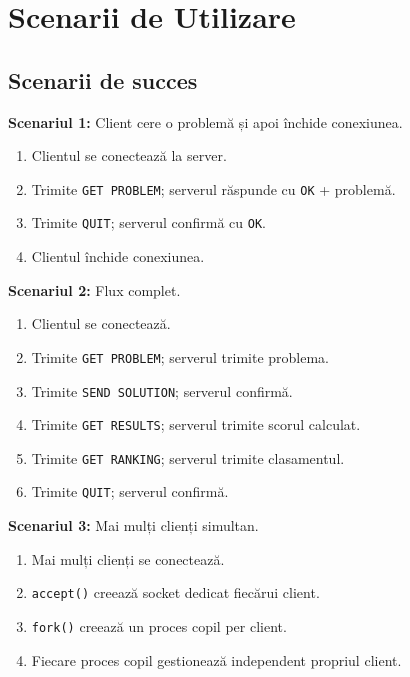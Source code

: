 \documentclass[runningheads]{llncs}
\begin{document}
\section{Scenarii de Utilizare}

\subsection{Scenarii de succes}

\textbf{Scenariul 1:} Client cere o problemă și apoi închide conexiunea.
\begin{enumerate}[noitemsep, topsep=0pt]
    \item Clientul se conectează la server.
    \item Trimite \texttt{GET PROBLEM}; serverul răspunde cu \texttt{OK} + problemă.
    \item Trimite \texttt{QUIT}; serverul confirmă cu \texttt{OK}.
    \item Clientul închide conexiunea.
\end{enumerate}

\vspace{5mm}

\textbf{Scenariul 2:} Flux complet.
\begin{enumerate}[noitemsep, topsep=0pt]
    \item Clientul se conectează.
    \item Trimite \texttt{GET PROBLEM}; serverul trimite problema.
    \item Trimite \texttt{SEND SOLUTION}; serverul confirmă.
    \item Trimite \texttt{GET RESULTS}; serverul trimite scorul calculat.
    \item Trimite \texttt{GET RANKING}; serverul trimite clasamentul.
    \item Trimite \texttt{QUIT}; serverul confirmă.
\end{enumerate}

\vspace{5mm}

\textbf{Scenariul 3:} Mai mulți clienți simultan.
\begin{enumerate}[noitemsep, topsep=0pt]
    \item Mai mulți clienți se conectează.
    \item \texttt{accept()} creează socket dedicat fiecărui client.
    \item \texttt{fork()} creează un proces copil per client.
    \item Fiecare proces copil gestionează independent propriul client.
\end{enumerate}
\end{document}
